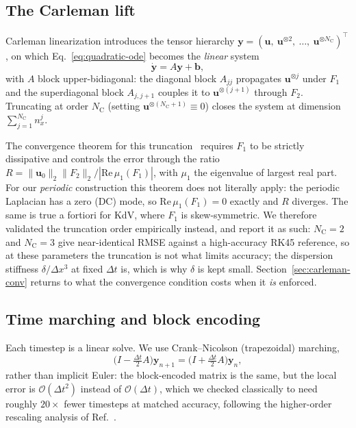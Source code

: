\documentclass[aps,prx,twocolumn,notitlepage,superscriptaddress,floatfix,10pt]{revtex4-2}
\newcommand{\norm}[1]{\lVert #1 \rVert}
\newcommand{\Oh}{\mathcal{O}}
\newcommand{\NC}{N_{\mathrm{C}}}
\begin{document}
\subsection{The Carleman lift}

Carleman linearization introduces the tensor hierarchy
$\bm y=(\bm u,\ \bm u^{\otimes2},\ \dots,\ \bm u^{\otimes\NC})^{\!\top}$, on which
Eq.~\eqref{eq:quadratic-ode} becomes the \emph{linear} system
\begin{equation}
\dot{\bm y}=A\bm y+\bm b,
\label{eq:carleman}
\end{equation}
with $A$ block upper-bidiagonal: the diagonal block $A_{jj}$ propagates $\bm u^{\otimes j}$ under
$F_1$ and the superdiagonal block $A_{j,j+1}$ couples it to $\bm u^{\otimes(j+1)}$ through $F_2$.
Truncating at order $\NC$ (setting $\bm u^{\otimes(\NC+1)}\equiv0$) closes the system at dimension
$\sum_{j=1}^{\NC}n_x^j$.

The convergence theorem for this truncation~\cite{Liu2021} requires $F_1$ to be strictly dissipative
and controls the error through the ratio
$R=\norm{\bm u_0}_2\norm{F_2}_2/|\mathrm{Re}\,\mu_1(F_1)|$, with $\mu_1$ the eigenvalue of largest
real part. For our \emph{periodic} construction this theorem does not literally apply: the periodic
Laplacian has a zero (DC) mode, so $\mathrm{Re}\,\mu_1(F_1)=0$ exactly and $R$ diverges. The same is
true a fortiori for KdV, where $F_1$ is skew-symmetric. We therefore validated the truncation order
empirically instead, and report it as such: $\NC=2$ and $\NC=3$ give near-identical RMSE against a
high-accuracy RK45 reference, so at these parameters the truncation is not what limits accuracy; the
dispersion stiffness $\delta/\Delta x^3$ at fixed $\Delta t$ is, which is why $\delta$ is kept small.
Section~\ref{sec:carleman-conv} returns to what the convergence condition costs when it \emph{is}
enforced.

\subsection{Time marching and block encoding}

Each timestep is a linear solve. We use Crank--Nicolson (trapezoidal) marching,
\begin{equation}
\Big(I-\tfrac{\Delta t}{2}A\Big)\bm y_{n+1}=\Big(I+\tfrac{\Delta t}{2}A\Big)\bm y_n,
\label{eq:cn}
\end{equation}
rather than implicit Euler: the block-encoded matrix is the same, but the local error is
$\Oh(\Delta t^2)$ instead of $\Oh(\Delta t)$, which we checked classically to need roughly $20\times$
fewer timesteps at matched accuracy, following the higher-order rescaling analysis of
Ref.~\cite{Costa2025}.
\end{document}
